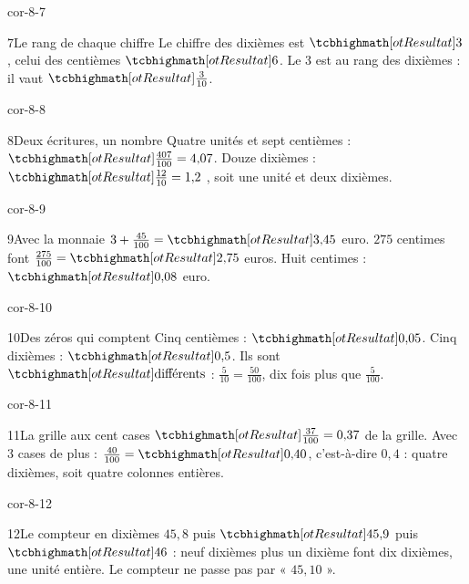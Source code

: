 \begin{blocLivre}{cor-8-7}\begin{corrige}{7}{Le rang de chaque chiffre}
Le chiffre des dixièmes est $\res3$, celui des centièmes $\res6$. Le 3 est au rang des dixièmes : il vaut $\res{\frac3{10}}$.
\end{corrige}\end{blocLivre}
\begin{blocLivre}{cor-8-8}\begin{corrige}{8}{Deux écritures, un nombre}
Quatre unités et sept centièmes : $\res{\frac{407}{100}=4{,}07}$. Douze dixièmes : $\res{\frac{12}{10}=1{,}2}$ , soit une unité et deux dixièmes.
\end{corrige}\end{blocLivre}
\begin{blocLivre}{cor-8-9}\begin{corrige}{9}{Avec la monnaie}
$3+\frac{45}{100}=\res{3{,}45}$ euro. $275$ centimes font $\frac{275}{100}=\res{2{,}75}$ euros. Huit centimes : $\res{0{,}08}$ euro.
\end{corrige}\end{blocLivre}
\begin{blocLivre}{cor-8-10}\begin{corrige}{10}{Des zéros qui comptent}
Cinq centièmes : $\res{0{,}05}$. Cinq dixièmes : $\res{0{,}5}$. Ils sont $\res{\text{différents}}$ : $\frac5{10}=\frac{50}{100}$, dix fois plus que $\frac5{100}$.
\end{corrige}\end{blocLivre}
\begin{blocLivre}{cor-8-11}\begin{corrige}{11}{La grille aux cent cases}
$\res{\frac{37}{100}=0{,}37}$ de la grille. Avec 3 cases de plus : $\frac{40}{100}=\res{0{,}40}$, c’est-à-dire $0{,}4$ : quatre dixièmes, soit quatre colonnes entières.
\label{fig-cor-8-11}
\end{corrige}\end{blocLivre}
\begin{blocLivre}{cor-8-12}\begin{corrige}{12}{Le compteur en dixièmes}
$45{,}8$ puis $\res{45{,}9}$ puis $\res{46}$ : neuf dixièmes plus un dixième font dix dixièmes, une unité entière. Le compteur ne passe pas par « $45{,}10$ ».
\end{corrige}\end{blocLivre}
